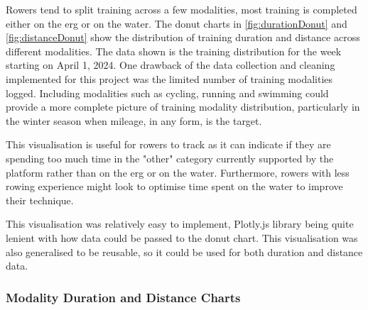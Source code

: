 Rowers tend to split training across a few modalities, most training is completed either on the erg or on the water. The donut charts in \autoref{fig:durationDonut} and \autoref{fig:distanceDonut} show the distribution of training duration and distance across different modalities. The data shown is the training distribution for the week starting on April 1, 2024. One drawback of the data collection and cleaning implemented for this project was the limited number of training modalities logged. Including modalities such as cycling, running and swimming could provide a more complete picture of training modality distribution, particularly in the winter season when mileage, in any form, is the target.

This visualisation is useful for rowers to track as it can indicate if they are spending too much time in the "other" category currently supported by the platform rather than on the erg or on the water. Furthermore, rowers with less rowing experience might look to optimise time spent on the water to improve their technique.

This visualisation was relatively easy to implement, Plotly.js library being quite lenient with how data could be passed to the donut chart. This visualisation was also generalised to be reusable, so it could be used for both duration and distance data.

\subsubsection{Modality Duration and Distance Charts}

